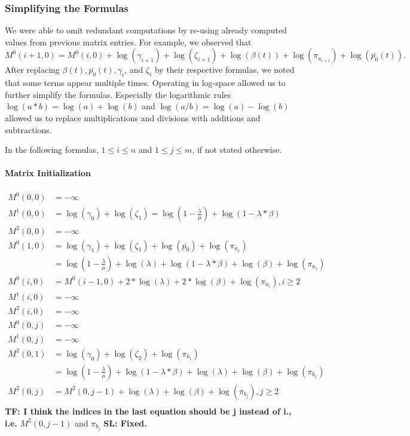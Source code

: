 \documentclass[runningheads,a4paper]{llncs}
\begin{document}
\subsubsection{Simplifying the Formulas}
We were able to omit redundant computations by re-using already computed values from previous matrix entries.
For example, we observed that $$M^0(i+1,0) = M^0(i,0) + \log(\gamma_{i+1}) + \log(\zeta_{i+1}) + \log(\beta(t)) + \log(\pi_{a_{i+1}}) + \log(\bar{p_0}(t)).$$
After replacing $\beta(t), \bar{p_0}(t), \gamma_i$, and $\zeta_i$ by their respective formulas, we noted that some terms appear multiple times.
Operating in log-space allowed us to further simplify the formulas. Especially the logarithmic rules $\log(a*b) = \log(a) + \log(b)$ and $\log(a/b) = \log(a) - \log(b)$
allowed us to replace multiplications and divisions with additions and subtractions.

In the following formulas, $1 \leq i \leq n$ and $1 \leq j \leq m$, if not stated otherwise.

\paragraph{Matrix Initialization}
\label{sec:formulas:init}
\begin{align*}
M^0(0,0) &= -\infty \\
M^1(0,0) &= \log(\gamma_0) + \log(\zeta_1)
		= \log(1-\frac{\lambda}{\mu}) + \log (1 - \lambda * \beta) \\
M^2(0,0) &= -\infty \\
M^0(1,0) &= \log(\gamma_1) + \log(\zeta_1) + \log(\bar{p_0}) + \log(\pi_{a_1}) \\
		&= \log(1- \frac{\lambda}{\mu}) + \log(\lambda) + \log(1- \lambda *\beta) + \log(\beta) + \log(\pi_{a_1}) \\
M^0(i,0) &= M^0(i-1,0) + 2*\log(\lambda) + 2*\log(\beta) + \log(\pi_{a_i}), i \geq 2 \\
M^1(i,0) &= -\infty \\
M^2(i,0) &= -\infty \\
M^0(0,j) &= -\infty \\
M^1(0,j) &= -\infty \\
M^2(0,1) &= \log(\gamma_0) + \log(\zeta_2) + \log(\pi_{b_1}) \\
		&= \log(1- \frac{\lambda}{\mu}) + \log(1-\lambda*\beta) + \log(\lambda) + \log(\beta) + \log(\pi_{b_1}) \\
M^2(0,j) &= M^2(0, j-1) + \log(\lambda) + \log(\beta) + \log(\pi_{b_j}), j \geq 2 \\
\end{align*}
\textbf{TF: I think the indices in the last equation should be j instead of i., i.e.} $M^2(0,j-1)$ and $\pi_{b_j}$ \textbf{SL: Fixed.}
\end{document}
